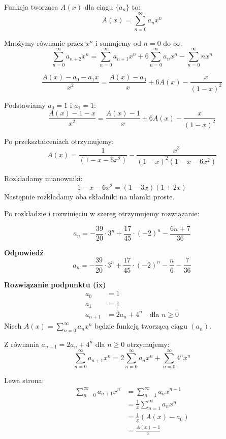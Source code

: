 \documentclass{mwart}
\begin{document}
\begin{mdframed}
    Funkcja tworząca $A(x)$ dla ciągu $\{a_n\}$ to:
    \[
    A(x) = \sum_{n=0}^{\infty} a_n x^n
    \]

    Mnożymy równanie przez $x^{n}$ i sumujemy od $n=0$ do $\infty$:
    \[
    \sum_{n=0}^{\infty} a_{n+2} x^n = \sum_{n=0}^{\infty} a_{n+1} x^n + 6 \sum_{n=0}^{\infty} a_n x^n - \sum_{n=0}^{\infty} n x^n
    \]

    \[
    \frac{A(x) - a_0 - a_1 x}{x^2} = \frac{A(x) - a_0}{x} + 6 A(x) - \frac{x}{(1-x)^2}
    \]

    Podstawiamy $a_0 = 1$ i $a_1 = 1$:
    \[
    \frac{A(x) - 1 - x}{x^2} = \frac{A(x) - 1}{x} + 6 A(x) - \frac{x}{(1-x)^2}
    \]

    Po przekształceniach otrzymujemy:
    \[
    A(x) = \frac{1}{(1 - x - 6 x^2)} - \frac{x^3}{(1-x)^2 (1 - x - 6 x^2)}
    \]

    Rozkładamy mianowniki:
    \[
    1 - x - 6 x^2 = (1 - 3x)(1 + 2x)
    \]
    Następnie rozkładamy oba składniki na ułamki proste.

    Po rozkładzie i rozwinięciu w szereg otrzymujemy rozwiązanie:

    \[
    a_n = -\frac{39}{20} \cdot 3^n + \frac{17}{45} \cdot (-2)^n - \frac{6n + 7}{36}
    \]

    \textbf{Odpowiedź}
    \[
    \boxed{a_n = -\frac{39}{20} \cdot 3^n + \frac{17}{45} \cdot (-2)^n - \frac{n}{6} - \frac{7}{36}}
    \]


    \textbf{Rozwiązanie podpunktu (ix)}
    \begin{align}
    a_0 &= 1 \\
    a_1 &= 1 \\
    a_{n+1} &= 2a_n + 4^n \quad \text{dla } n \geq 0
    \end{align}
    Niech $A(x) = \sum_{n=0}^{\infty} a_n x^n$ będzie funkcją tworzącą ciągu $(a_n)$.
        
    Z równania $a_{n+1} = 2a_n + 4^n$ dla $n \geq 0$ otrzymujemy:
    \begin{equation}
    \sum_{n=0}^{\infty} a_{n+1} x^n = 2\sum_{n=0}^{\infty} a_n x^n + \sum_{n=0}^{\infty} 4^n x^n
    \end{equation}
        
    Lewa strona:
    \begin{align}
    \sum_{n=0}^{\infty} a_{n+1} x^n &= \sum_{n=1}^{\infty} a_n x^{n-1} \\
    &= \frac{1}{x}\sum_{n=1}^{\infty} a_n x^n \\
    &= \frac{1}{x}(A(x) - a_0) \\
    &= \frac{A(x) - 1}{x}
    \end{align}
        

\end{mdframed}
\end{document}
